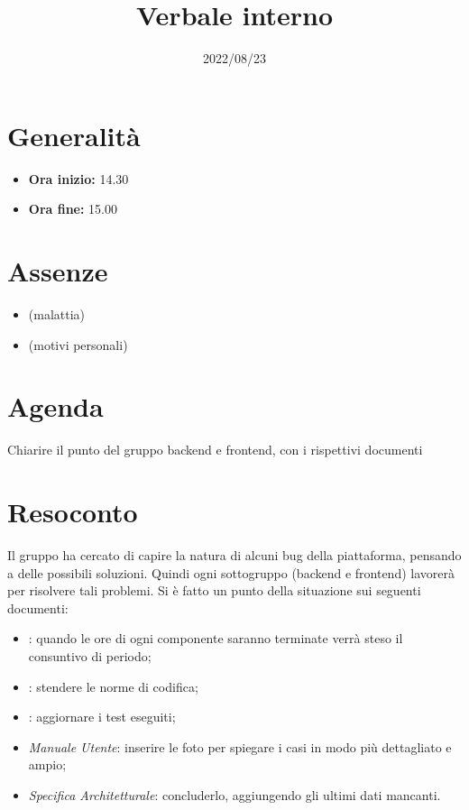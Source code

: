 \documentclass{classes/base}
\title{Verbale interno}
\date{2022/08/23}
\author{\angela}
\renewcommand{\maketitle}{
    
}
\begin{document}
    \maketitle

    \section*{Generalità}
    \begin{itemize}
        \item \textbf{Ora inizio:} 14.30
        \item \textbf{Ora fine:} 15.00
    \end{itemize}

    \section*{Assenze}
    \begin{itemize}
        \item \marcob{} (malattia)
        \item \ruth{} (motivi personali)
    \end{itemize}

    \section*{Agenda}
    Chiarire il punto del gruppo backend e frontend, con i rispettivi documenti

    \section*{Resoconto}
    Il gruppo ha cercato di capire la natura di alcuni bug della piattaforma, pensando a delle possibili soluzioni. 
    Quindi ogni sottogruppo (backend e frontend) lavorerà per risolvere tali problemi. 
    Si è fatto un punto della situazione sui seguenti documenti:
    \begin{itemize}
        \item \PdP: quando le ore di ogni componente saranno terminate verrà steso il consuntivo di periodo;
        \item \NdP: stendere le norme di codifica; 
        \item \PdQ: aggiornare i test eseguiti;
        \item \textit{Manuale Utente}: inserire le foto per spiegare i casi in modo più dettagliato e ampio;
        \item \textit{Specifica Architetturale}: concluderlo, aggiungendo gli ultimi dati mancanti.
    \end{itemize}
 
\end{document}
